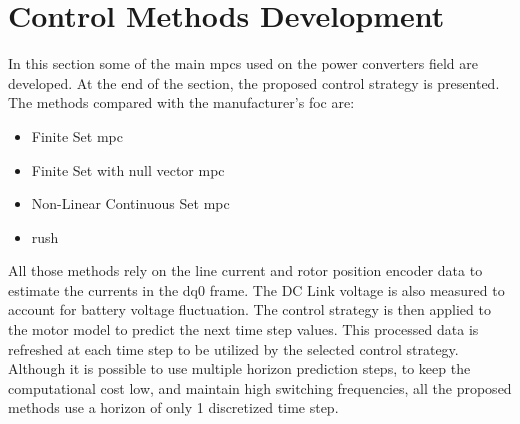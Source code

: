 \section{Control Methods Development}
\label{section:Control Methods Development}%

In this section some of the main \glspl{mpc} used on the power converters field are developed. At the end of the section, the proposed control strategy is presented. The methods compared with the manufacturer's \gls{foc} are:
\begin{itemize}
	\item Finite Set \gls{mpc}
	\item Finite Set with null vector \gls{mpc}
	\item Non-Linear Continuous Set \gls{mpc}
	\item \acrfull{rush}
\end{itemize}
All those methods rely on the line current and rotor position encoder data to estimate the currents in the dq0 frame. The DC Link voltage is also measured to account for battery voltage fluctuation. The control strategy is then applied to the motor model to predict the next time step values. This processed data is refreshed at each time step to be utilized by the selected control strategy.
Although it is possible to use multiple horizon prediction steps, to keep the computational cost low, and maintain high switching frequencies, all the proposed methods use a horizon of only 1 discretized time step. 

